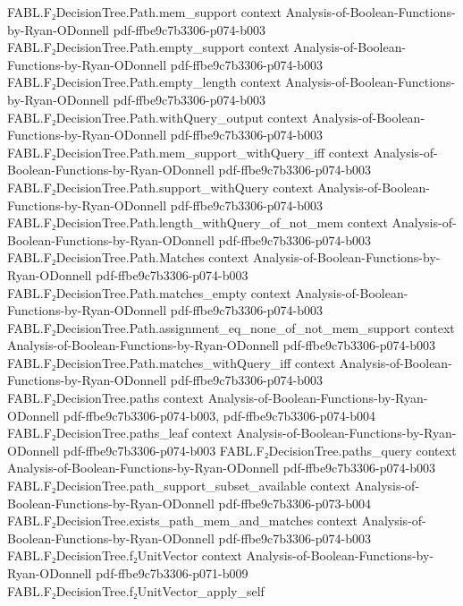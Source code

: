 \begin{theorem}
  {FABL.F₂DecisionTree.Path.mem_support}
  {context}
  {Analysis-of-Boolean-Functions-by-Ryan-ODonnell}
  {pdf-ffbe9c7b3306-p074-b003}
\proofstep
  {FABL.F₂DecisionTree.Path.empty_support}
  {context}
  {Analysis-of-Boolean-Functions-by-Ryan-ODonnell}
  {pdf-ffbe9c7b3306-p074-b003}
\proofstep
  {FABL.F₂DecisionTree.Path.empty_length}
  {context}
  {Analysis-of-Boolean-Functions-by-Ryan-ODonnell}
  {pdf-ffbe9c7b3306-p074-b003}
\proofstep
  {FABL.F₂DecisionTree.Path.withQuery_output}
  {context}
  {Analysis-of-Boolean-Functions-by-Ryan-ODonnell}
  {pdf-ffbe9c7b3306-p074-b003}
\proofstep
  {FABL.F₂DecisionTree.Path.mem_support_withQuery_iff}
  {context}
  {Analysis-of-Boolean-Functions-by-Ryan-ODonnell}
  {pdf-ffbe9c7b3306-p074-b003}
\proofstep
  {FABL.F₂DecisionTree.Path.support_withQuery}
  {context}
  {Analysis-of-Boolean-Functions-by-Ryan-ODonnell}
  {pdf-ffbe9c7b3306-p074-b003}
\proofstep
  {FABL.F₂DecisionTree.Path.length_withQuery_of_not_mem}
  {context}
  {Analysis-of-Boolean-Functions-by-Ryan-ODonnell}
  {pdf-ffbe9c7b3306-p074-b003}
\proofstep
  {FABL.F₂DecisionTree.Path.Matches}
  {context}
  {Analysis-of-Boolean-Functions-by-Ryan-ODonnell}
  {pdf-ffbe9c7b3306-p074-b003}
\proofstep
  {FABL.F₂DecisionTree.Path.matches_empty}
  {context}
  {Analysis-of-Boolean-Functions-by-Ryan-ODonnell}
  {pdf-ffbe9c7b3306-p074-b003}
\proofstep
  {FABL.F₂DecisionTree.Path.assignment_eq_none_of_not_mem_support}
  {context}
  {Analysis-of-Boolean-Functions-by-Ryan-ODonnell}
  {pdf-ffbe9c7b3306-p074-b003}
\proofstep
  {FABL.F₂DecisionTree.Path.matches_withQuery_iff}
  {context}
  {Analysis-of-Boolean-Functions-by-Ryan-ODonnell}
  {pdf-ffbe9c7b3306-p074-b003}
\proofstep
  {FABL.F₂DecisionTree.paths}
  {context}
  {Analysis-of-Boolean-Functions-by-Ryan-ODonnell}
  {pdf-ffbe9c7b3306-p074-b003,
    pdf-ffbe9c7b3306-p074-b004}
\proofstep
  {FABL.F₂DecisionTree.paths_leaf}
  {context}
  {Analysis-of-Boolean-Functions-by-Ryan-ODonnell}
  {pdf-ffbe9c7b3306-p074-b003}
\proofstep
  {FABL.F₂DecisionTree.paths_query}
  {context}
  {Analysis-of-Boolean-Functions-by-Ryan-ODonnell}
  {pdf-ffbe9c7b3306-p074-b003}
\proofstep
  {FABL.F₂DecisionTree.path_support_subset_available}
  {context}
  {Analysis-of-Boolean-Functions-by-Ryan-ODonnell}
  {pdf-ffbe9c7b3306-p073-b004}
\proofstep
  {FABL.F₂DecisionTree.exists_path_mem_and_matches}
  {context}
  {Analysis-of-Boolean-Functions-by-Ryan-ODonnell}
  {pdf-ffbe9c7b3306-p074-b003}
\proofstep
  {FABL.F₂DecisionTree.f₂UnitVector}
  {context}
  {Analysis-of-Boolean-Functions-by-Ryan-ODonnell}
  {pdf-ffbe9c7b3306-p071-b009}
\proofstep
  {FABL.F₂DecisionTree.f₂UnitVector_apply_self}

\end{theorem}
